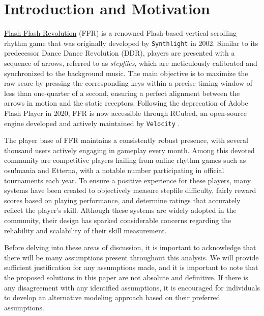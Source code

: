 \section{Introduction and Motivation}
\label{sec:introduction}

\href{https://www.Flash Flash Revolution.com/}{Flash Flash Revolution} (FFR) is a renowned Flash-based vertical scrolling rhythm game that was originally developed by \texttt{Synthlight} in 2002. Similar to its predecessor Dance Dance Revolution (DDR), players are presented with a sequence of arrows, referred to as \textit{stepfiles}, which are meticulously calibrated and synchronized to the background music. The main objective is to maximize the raw score by pressing the corresponding keys within a precise timing window of less than one-quarter of a second, ensuring a perfect alignment between the arrows in motion and the static receptors. Following the deprecation of Adobe Flash Player in 2020, FFR is now accessible through RCubed, an open-source engine developed and actively maintained by \texttt{Velocity} \cite{20200427}.

\vspace{2mm}

The player base of FFR maintains a consistently robust presence, with several thousand users actively engaging in gameplay every month. Among this devoted community are competitive players hailing from online rhythm games such as osu!mania and Etterna, with a notable number participating in official tournaments each year. To ensure a positive experience for these players, many systems have been created to objectively measure stepfile difficulty, fairly reward scores based on playing performance, and determine ratings that accurately reflect the player's skill. Although these systems are widely adopted in the community, their design has sparked considerable concerns regarding the reliability and scalability of their skill measurement.

\vspace{2mm}

Before delving into these areas of discussion, it is important to acknowledge that there will be many assumptions present throughout this analysis. We will provide sufficient justification for any assumptions made, and it is important to note that the proposed solutions in this paper are not absolute and definitive. If there is any disagreement with any identified assumptions, it is encouraged for individuals to develop an alternative modeling approach based on their preferred assumptions.

